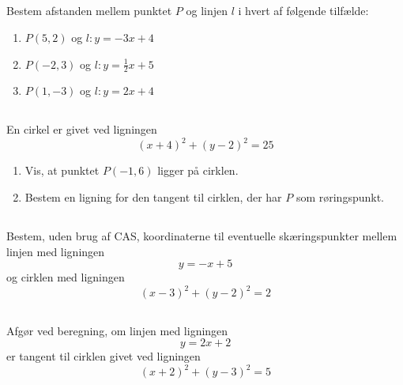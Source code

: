 \documentclass[10pt,a4paper,table]{article}
\begin{document}
\subsection{}
Bestem afstanden mellem punktet $P$ og linjen $l$ i hvert af følgende tilfælde:
\begin{enumerate}[label=\arabic*)]
  \item $P(5,2)$ \quad og \quad $l: y = -3x+4$
  \item $P(-2,3)$ \quad og \quad $l: y = \frac{1}{2}x+5$
  \item $P(1,-3)$ \quad og \quad $l: y = 2x+4$
\end{enumerate}

\subsection{}
En cirkel er givet ved ligningen
\[
  (x+4)^2 + (y-2)^2 = 25
\]
\begin{enumerate}[label=\arabic*)]
  \item Vis, at punktet $P(-1,6)$ ligger på cirklen.
  \item Bestem en ligning for den tangent til cirklen, der har $P$ som røringspunkt.
\end{enumerate}

\subsection{}
Bestem, uden brug af CAS, koordinaterne til eventuelle skæringspunkter mellem linjen med ligningen
\[
  y = -x+5
\]
og cirklen med ligningen
\[
  (x-3)^2 + (y-2)^2 = 2
\]

\subsection{}
Afgør ved beregning, om linjen med ligningen
\[
  y = 2x+2
\]
er tangent til cirklen givet ved ligningen
\[
  (x+2)^2 + (y-3)^2 = 5
\]
\end{document}
